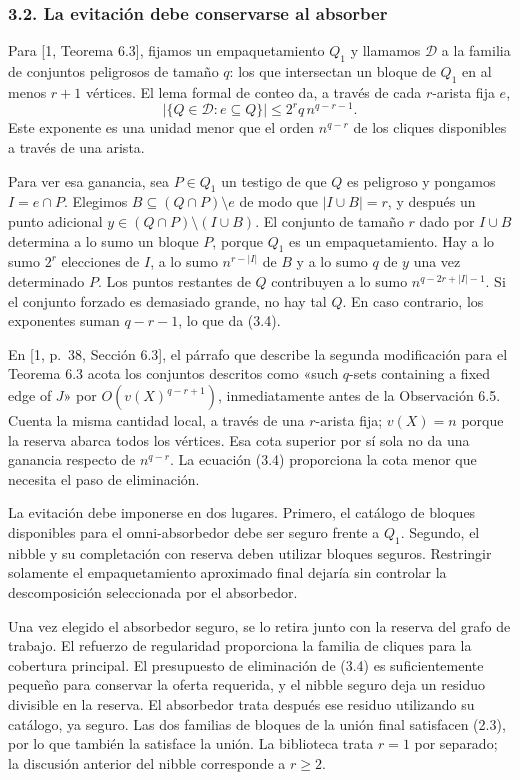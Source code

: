 \documentclass[spanish,11pt,a4paper]{article}
\begin{document}
\subsubsection{3.2. La evitación debe conservarse al absorber}\label{la-evitaciuxf3n-debe-conservarse-al-absorber}

Para {[}1, Teorema 6.3{]}, fijamos un empaquetamiento \(Q_1\) y llamamos \(\mathcal D\) a la familia de conjuntos peligrosos de tamaño \(q\): los que intersectan un bloque de \(Q_1\) en al menos \(r+1\) vértices. El lema formal de conteo da, a través de cada \(r\)-arista fija \(e\), \[|\{Q\in\mathcal D:e\subseteq Q\}|
\le 2^r q\,n^{q-r-1}.
\tag{3.4}\] Este exponente es una unidad menor que el orden \(n^{q-r}\) de los cliques disponibles a través de una arista.

Para ver esa ganancia, sea \(P\in Q_1\) un testigo de que \(Q\) es peligroso y pongamos \(I=e\cap P\). Elegimos \(B\subseteq(Q\cap P)\setminus e\) de modo que \(|I\cup B|=r\), y después un punto adicional \(y\in(Q\cap P)\setminus(I\cup B)\). El conjunto de tamaño \(r\) dado por \(I\cup B\) determina a lo sumo un bloque \(P\), porque \(Q_1\) es un empaquetamiento. Hay a lo sumo \(2^r\) elecciones de \(I\), a lo sumo \(n^{r-|I|}\) de \(B\) y a lo sumo \(q\) de \(y\) una vez determinado \(P\). Los puntos restantes de \(Q\) contribuyen a lo sumo \(n^{q-2r+|I|-1}\). Si el conjunto forzado es demasiado grande, no hay tal \(Q\). En caso contrario, los exponentes suman \(q-r-1\), lo que da (3.4).

En {[}1, p.~38, Sección 6.3{]}, el párrafo que describe la segunda modificación para el Teorema 6.3 acota los conjuntos descritos como «such \(q\)-sets containing a fixed edge of \(J\)» por \(O(v(X)^{q-r+1})\), inmediatamente antes de la Observación 6.5. Cuenta la misma cantidad local, a través de una \(r\)-arista fija; \(v(X)=n\) porque la reserva abarca todos los vértices. Esa cota superior por sí sola no da una ganancia respecto de \(n^{q-r}\). La ecuación (3.4) proporciona la cota menor que necesita el paso de eliminación.

La evitación debe imponerse en dos lugares. Primero, el catálogo de bloques disponibles para el omni-absorbedor debe ser seguro frente a \(Q_1\). Segundo, el nibble y su completación con reserva deben utilizar bloques seguros. Restringir solamente el empaquetamiento aproximado final dejaría sin controlar la descomposición seleccionada por el absorbedor.

Una vez elegido el absorbedor seguro, se lo retira junto con la reserva del grafo de trabajo. El refuerzo de regularidad proporciona la familia de cliques para la cobertura principal. El presupuesto de eliminación de (3.4) es suficientemente pequeño para conservar la oferta requerida, y el nibble seguro deja un residuo divisible en la reserva. El absorbedor trata después ese residuo utilizando su catálogo, ya seguro. Las dos familias de bloques de la unión final satisfacen (2.3), por lo que también la satisface la unión. La biblioteca trata \(r=1\) por separado; la discusión anterior del nibble corresponde a \(r\ge2\).
\end{document}
